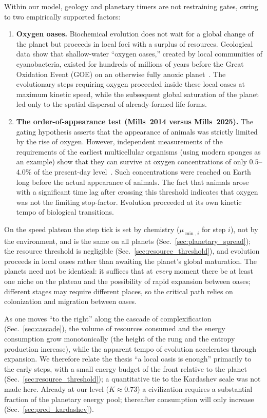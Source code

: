 \documentclass[11pt,a4paper]{article}
\begin{document}
Within our model, geology and planetary timers are not restraining gates, owing to two empirically supported factors:
\begin{enumerate}
   \item \textbf{Oxygen oases.} Biochemical evolution does not wait for a global change of the planet but proceeds in local foci with a surplus of resources. Geological data show that shallow-water ``oxygen oases,'' created by local communities of cyanobacteria, existed for hundreds of millions of years before the Great Oxidation Event (GOE) on an otherwise fully anoxic planet~\cite{Riding2014,Ostrander2019}. The evolutionary steps requiring oxygen proceeded inside these local oases at maximum kinetic speed, while the subsequent global saturation of the planet led only to the spatial dispersal of already-formed life forms.
   \item \textbf{The order-of-appearance test (Mills~2014 versus Mills~2025).} The gating hypothesis asserts that the appearance of animals was strictly limited by the rise of oxygen. However, independent measurements of the requirements of the earliest multicellular organisms (using modern sponges as an example) show that they can survive at oxygen concentrations of only $0.5$--$4.0\%$ of the present-day level~\cite{Mills2014}. Such concentrations were reached on Earth long before the actual appearance of animals. The fact that animals arose with a significant time lag after crossing this threshold indicates that oxygen was not the limiting stop-factor. Evolution proceeded at its own kinetic tempo of biological transitions.
\end{enumerate}

\label{sec:plateau}
On the speed plateau the step tick is set by chemistry ($\mu_{\min,i}$ for step $i$), not by the environment, and is the same on all planets (Sec.~\ref{sec:planetary_spread}); the resource threshold is negligible (Sec.~\ref{sec:resource_threshold}), and evolution proceeds in local oases rather than awaiting the planet's global maturation. The planets need not be identical: it suffices that at \emph{every} moment there be at least one niche on the plateau and the possibility of rapid expansion between oases; different stages may require different places, so the critical path relies on colonization and migration between oases.

As one moves ``to the right'' along the cascade of complexification (Sec.~\ref{sec:cascade}), the volume of resources consumed and the energy consumption grow monotonically (the height of the rung and the entropy production increase), while the apparent tempo of evolution accelerates through expansion. We therefore relate the thesis ``a local oasis is enough'' primarily to the early steps, with a small energy budget of the front relative to the planet (Sec.~\ref{sec:resource_threshold}); a quantitative tie to the Kardashev scale was not made here. Already at our level ($K \approx 0.73$) a civilization requires a substantial fraction of the planetary energy pool; thereafter consumption will only increase (Sec.~\ref{sec:pred_kardashev}).
\end{document}
